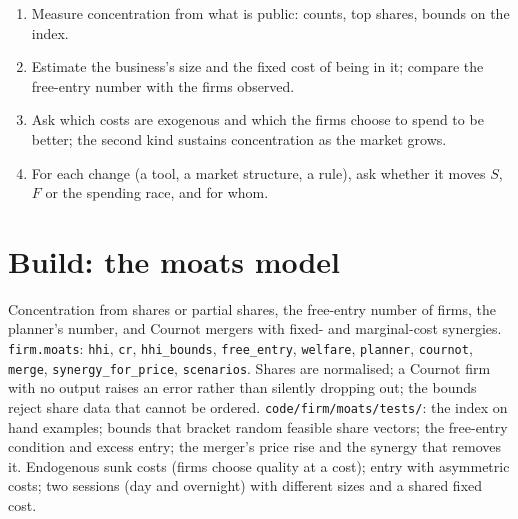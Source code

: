 \begin{method}\label{met:fm:competition-and-the-future:read}
\begin{enumerate}
\item Measure concentration from what is public: counts, top shares, bounds on the index.
\item Estimate the business's size and the fixed cost of being in it; compare the free-entry number with the firms observed.
\item Ask which costs are exogenous and which the firms choose to spend to be better; the second kind sustains concentration as the market grows.
\item For each change (a tool, a market structure, a rule), ask whether it moves $S$, $F$ or the spending race, and for whom.
\end{enumerate}
\end{method}

\section{Build: the moats model}\label{bld:fm:competition-and-the-future:moats}

\begin{build}
 Concentration from shares or partial shares, the free-entry number of firms, the planner's number, and Cournot mergers with fixed-
and marginal-cost synergies.
 \texttt{firm.moats}: \texttt{hhi}, \texttt{cr}, \texttt{hhi\_bounds}, \texttt{free\_entry}, \texttt{welfare}, \texttt{planner},
\texttt{cournot}, \texttt{merge}, \texttt{synergy\_for\_price}, \texttt{scenarios}.
 Shares are normalised; a Cournot firm with no output raises an error rather than silently dropping out; the bounds reject share data
that cannot be ordered.
 \texttt{code/firm/moats/tests/}: the index on hand examples; bounds that bracket random feasible share vectors; the
free-entry condition and excess entry; the merger's price rise and the synergy that removes it.
 Endogenous sunk costs (firms choose quality at a cost); entry with asymmetric costs; two sessions (day and overnight) with different
sizes and a shared fixed cost.
\end{build}

